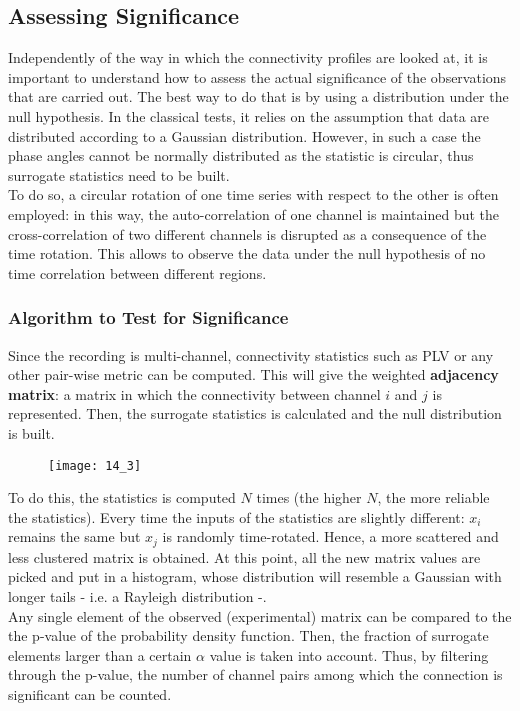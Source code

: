\subsection{Assessing Significance}
Independently of the way in which the connectivity profiles are looked at, it is important to understand
how to assess the actual significance of the observations that are carried out. The best way to do that
is by using a distribution under the null hypothesis. In the classical tests, it relies on the
assumption that data are distributed according to a Gaussian distribution. However, in such a case the
phase angles cannot be normally distributed as the statistic is circular, thus surrogate statistics need
to be built.\\
To do so, a circular rotation of one time series with respect to the other is often employed: in this way,
the auto-correlation of one channel is maintained but the cross-correlation of two different channels is
disrupted as a consequence of the time rotation. This allows to observe the data under the null
hypothesis of no time correlation between different regions.
\subsubsection{Algorithm to Test for Significance}
Since the recording is multi-channel, connectivity statistics such as PLV or any other pair-wise metric
can be computed. This will give the weighted \textbf{adjacency matrix}: a matrix in which the
connectivity between channel \(i\) and \(j\) is represented. Then, the surrogate statistics is calculated
and the null distribution is built.
\begin{figure}[H]
    \centering
    \texttt{[image: 14\_3]}
\end{figure}
To do this, the statistics is computed \(N\) times (the higher \(N\), the more reliable the statistics).
Every time the inputs of the statistics are slightly different: \(x_i\) remains the same but \(x_j\) is
randomly time-rotated. Hence, a more scattered and less clustered matrix is obtained. At this point, all
the new matrix values are picked and put in a histogram, whose distribution will resemble a Gaussian with
longer tails - i.e. a Rayleigh distribution -.\\
Any single element of the observed (experimental) matrix can be compared to the the p-value of the
probability density function. Then, the fraction of surrogate elements larger than a certain \(\alpha\)
value is taken into account. Thus, by filtering through the p-value, the number of channel pairs among
which the connection is significant can be counted.
